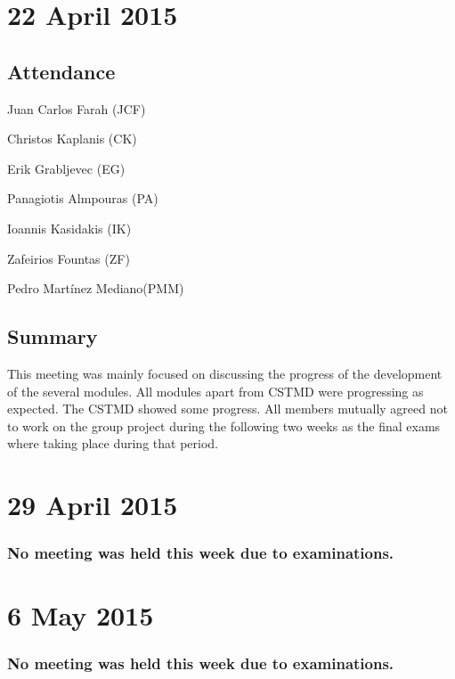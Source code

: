 \documentclass[a4paper,11pt]{article}
\begin{document}
\section*{22 April 2015}
\subsection*{Attendance}
\begin{compactenum}
\item Juan Carlos Farah (JCF)
\item Christos Kaplanis (CK)
\item Erik Grabljevec (EG)
\item Panagiotis Almpouras (PA)
\item Ioannis Kasidakis (IK)
\item Zafeirios Fountas (ZF)
\item Pedro Martínez Mediano(PMM)
\end{compactenum}

\subsection*{Summary}
This meeting was mainly focused on discussing the progress of the development of the several modules. All modules apart from CSTMD were progressing as expected. The CSTMD showed some progress. All members mutually agreed not to work on the group project during the following two weeks as the final exams where taking place during that period.

\maketitle
\section*{29 April 2015}
\subsubsection*{No meeting was held this week due to examinations.}

\maketitle
\section*{6 May 2015}
\subsubsection*{No meeting was held this week due to examinations.}
\end{document}

